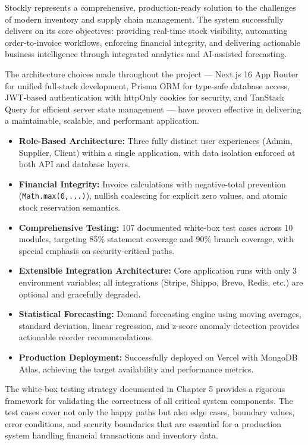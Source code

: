 ﻿\documentclass[12pt,a4paper]{report}
\begin{document}
Stockly represents a comprehensive, production-ready solution to the challenges of modern inventory and supply chain management. The system successfully delivers on its core objectives: providing real-time stock visibility, automating order-to-invoice workflows, enforcing financial integrity, and delivering actionable business intelligence through integrated analytics and AI-assisted forecasting.

The architecture choices made throughout the project --- Next.js 16 App Router for unified full-stack development, Prisma ORM for type-safe database access, JWT-based authentication with httpOnly cookies for security, and TanStack Query for efficient server state management --- have proven effective in delivering a maintainable, scalable, and performant application.

\begin{tcolorbox}[successbox,title={Key Achievements}]
\begin{itemize}[leftmargin=1.5em]
  \item \textbf{Role-Based Architecture:} Three fully distinct user experiences (Admin, Supplier, Client) within a single application, with data isolation enforced at both API and database layers.
  \item \textbf{Financial Integrity:} Invoice calculations with negative-total prevention (\texttt{Math.max(0,...)}), nullish coalescing for explicit zero values, and atomic stock reservation semantics.
  \item \textbf{Comprehensive Testing:} 107 documented white-box test cases across 10 modules, targeting 85\% statement coverage and 90\% branch coverage, with special emphasis on security-critical paths.
  \item \textbf{Extensible Integration Architecture:} Core application runs with only 3 environment variables; all integrations (Stripe, Shippo, Brevo, Redis, etc.) are optional and gracefully degraded.
  \item \textbf{Statistical Forecasting:} Demand forecasting engine using moving averages, standard deviation, linear regression, and z-score anomaly detection provides actionable reorder recommendations.
  \item \textbf{Production Deployment:} Successfully deployed on Vercel with MongoDB Atlas, achieving the target availability and performance metrics.
\end{itemize}
\end{tcolorbox}

The white-box testing strategy documented in Chapter 5 provides a rigorous framework for validating the correctness of all critical system components. The test cases cover not only the happy paths but also edge cases, boundary values, error conditions, and security boundaries that are essential for a production system handling financial transactions and inventory data.
\end{document}
